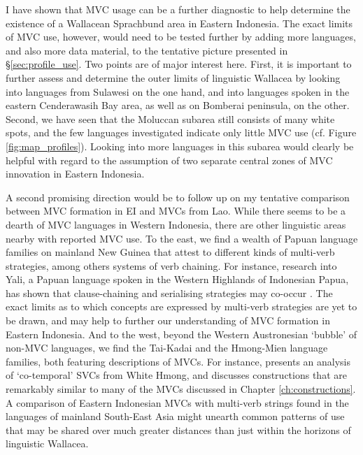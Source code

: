 I have shown that MVC usage can be a further diagnostic to help determine the existence of a Wallacean Sprachbund area in Eastern Indonesia. The exact limits of MVC use, however, would need to be tested further by adding more languages, and also more data material, to the tentative picture presented in §\ref{sec:profile_use}. Two points are of major interest here. First, it is important to further assess and determine the outer limits of linguistic Wallacea by looking into languages from Sulawesi on the one hand, and into languages spoken in the eastern Cenderawasih Bay area, as well as on Bomberai peninsula, on the other.  Second, we have seen that the Moluccan subarea still consists of many white spots, and the few languages investigated indicate only little MVC use (cf. Figure \ref{fig:map_profiles}). Looking into more languages in this subarea would clearly be helpful with regard to the assumption of two separate central zones of MVC innovation in Eastern Indonesia.

A second promising direction would be to follow up on my tentative comparison between MVC formation in EI and MVCs from Lao. While there seems to be a dearth of MVC languages in Western Indonesia, there are other linguistic areas nearby with reported MVC use. To the east, we find a wealth of Papuan language families on mainland New Guinea that attest to different kinds of multi-verb strategies, among others systems of verb chaining. For instance, research into Yali, a Papuan language spoken in the Western Highlands of Indonesian Papua, has shown that clause-chaining and serialising strategies may co-occur \citep{riesberg2013}. The exact limits as to which concepts are expressed by multi-verb strategies are yet to be drawn, and may help to further our understanding of MVC formation in Eastern Indonesia. And to the west, beyond the Western Austronesian `bubble' of non-MVC languages, we find the Tai-Kadai and the Hmong-Mien language families, both featuring descriptions of MVCs. For instance, \citet{jarkey2010cotemporal} presents an analysis of `co-temporal' SVCs from White Hmong, and discusses constructions that are remarkably similar to many of the MVCs discussed in Chapter \ref{ch:constructions}. A comparison of Eastern Indonesian MVCs with multi-verb strings found in the languages of mainland South-East Asia might unearth common patterns of use that may be shared over much greater distances than just within the horizons of linguistic Wallacea.

